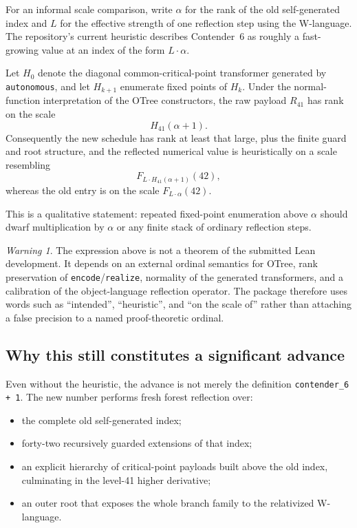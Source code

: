 \documentclass[11pt]{article}
\theoremstyle{definition}
\theoremstyle{remark}
\newtheorem{warning}[theorem]{Warning}
\newcommand{\lean}[1]{\texttt{#1}}
\begin{document}
For an informal scale comparison, write $\alpha$ for the rank of the old
self-generated index and $L$ for the effective strength of one reflection step
using the W-language.  The repository's current heuristic describes
Contender~6 as roughly a fast-growing value at an index of the form
$L\cdot\alpha$.

Let $H_0$ denote the diagonal common-critical-point transformer generated by
\lean{autonomous}, and let $H_{k+1}$ enumerate fixed points of $H_k$.  Under the
normal-function interpretation of the OTree constructors, the raw payload
$R_{41}$ has rank on the scale
\[
  H_{41}(\alpha+1).
\]
Consequently the new schedule has rank at least that large, plus the finite
guard and root structure, and the reflected numerical value is heuristically on
a scale resembling
\[
  F_{L\cdot H_{41}(\alpha+1)}(42),
\]
whereas the old entry is on the scale $F_{L\cdot\alpha}(42)$.

This is a qualitative statement: repeated fixed-point enumeration above
$\alpha$ should dwarf multiplication by $\alpha$ or any finite stack of ordinary
reflection steps.

\begin{warning}
The expression above is not a theorem of the submitted Lean development.  It
depends on an external ordinal semantics for OTree, rank preservation of
\lean{encode}/\lean{realize}, normality of the generated transformers, and a
calibration of the object-language reflection operator.  The package therefore
uses words such as ``intended'', ``heuristic'', and ``on the scale of'' rather
than attaching a false precision to a named proof-theoretic ordinal.
\end{warning}

\subsection{Why this still constitutes a significant advance}

Even without the heuristic, the advance is not merely the definition
\lean{contender\_6 + 1}.  The new number performs fresh forest reflection over:

\begin{itemize}[leftmargin=*]
\item the complete old self-generated index;
\item forty-two recursively guarded extensions of that index;
\item an explicit hierarchy of critical-point payloads built above the old
  index, culminating in the level-41 higher derivative;
\item an outer root that exposes the whole branch family to the relativized
  W-language.
\end{itemize}
\end{document}
